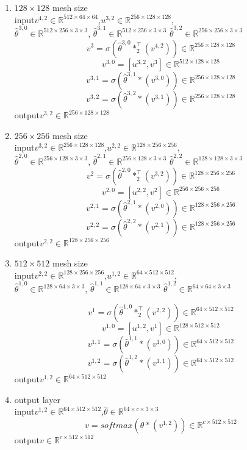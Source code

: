 \begin{enumerate}
	\item $128\times 128$ mesh size\\
	input\quad $v^{4,2} \in \mathbb{R}^{512\times 64\times 64}$,\quad$u^{3,2}\in \mathbb{R}^{256\times 128\times 128}$,\\
	$\hat{\theta}^{3,0} \in \mathbb{R}^{512\times 256\times 3\times 3}$,\quad
	$\hat{\theta}^{3,1} \in \mathbb{R}^{512\times 256\times 3\times 3}$\quad
	$\hat{\theta}^{3,2} \in \mathbb{R}^{256\times 256\times 3\times 3}$
	$$v^{3}= \sigma(\hat{\theta}^{3,0} \ast^{\top}_2 (v^{4,2}))\in \mathbb{R}^{256\times 128\times 128}$$
	$$v^{3,0}=[u^{3,2},v^{3}]\in \mathbb{R}^{512\times 128\times 128}$$
	$$v^{3,1}= \sigma(\hat{\theta}^{3,1} \ast (v^{3,0}))\in \mathbb{R}^{256\times 128\times 128}$$
	$$v^{3,2}= \sigma(\hat{\theta}^{3,2} \ast (v^{3,1}))\in \mathbb{R}^{256\times 128\times 128}$$
	output\quad $v^{3,2} \in \mathbb{R}^{256\times 128\times 128}$
	
	\item $256\times 256$ mesh size\\
	input\quad $v^{3,2} \in \mathbb{R}^{256\times 128\times 128}$,\quad$u^{2,2}\in \mathbb{R}^{128\times 256\times 256}$,\\
	$\hat{\theta}^{2,0} \in \mathbb{R}^{256\times 128\times 3\times 3}$,\quad
	$\hat{\theta}^{2,1} \in \mathbb{R}^{256\times 128\times 3\times 3}$\quad
	$\hat{\theta}^{2,2} \in \mathbb{R}^{128\times 128\times 3\times 3}$
	$$v^{2}= \sigma(\hat{\theta}^{2,0} \ast^{\top}_2 (v^{3,2}))\in \mathbb{R}^{128\times 256\times 256}$$
	$$v^{2,0}=[u^{2,2},v^{2}]\in \mathbb{R}^{256\times 256\times 256}$$
	$$v^{2,1}= \sigma(\hat{\theta}^{2,1} \ast (v^{2,0}))\in \mathbb{R}^{128\times 256\times 256}$$
	$$v^{2,2}= \sigma(\hat{\theta}^{2,2} \ast (v^{2,1}))\in \mathbb{R}^{128\times 256\times 256}$$
	output\quad $v^{2,2} \in \mathbb{R}^{128\times 256\times 256}$
	
	\item $512\times 512$ mesh size\\
	input\quad $v^{2,2} \in \mathbb{R}^{128\times 256\times 256}$,\quad$u^{1,2}\in \mathbb{R}^{64\times 512\times 512}$,\\
	$\hat{\theta}^{1,0} \in \mathbb{R}^{128\times 64\times 3\times 3}$,\quad
	$\hat{\theta}^{1,1} \in \mathbb{R}^{128\times 64\times 3\times 3}$\quad
	$\hat{\theta}^{1,2} \in \mathbb{R}^{64\times 64\times 3\times 3}$\quad
	
	$$v^{1}= \sigma(\hat{\theta}^{1,0} \ast^{\top}_2 (v^{2,2}))\in \mathbb{R}^{64\times 512\times 512}$$
	$$v^{1,0}=[u^{1,2},v^{1}]\in \mathbb{R}^{128\times 512\times 512}$$
	$$v^{1,1}= \sigma(\hat{\theta}^{1,1} \ast (v^{1,0}))\in \mathbb{R}^{64\times 512\times 512}$$
	$$v^{1,2}= \sigma(\hat{\theta}^{1,2} \ast (v^{1,1}))\in \mathbb{R}^{64\times 512\times 512}$$
	output\quad $v^{1,2} \in \mathbb{R}^{64\times 512\times 512}$     
	\item output layer\\
	input\quad $v^{1,2} \in \mathbb{R}^{64\times 512\times 512}$,\quad $\hat{\theta} \in \mathbb{R}^{64\times c \times 3\times 3}$
	$$v= softmax(\hat{\theta} \ast (v^{1,2}))\in \mathbb{R}^{c\times 512\times 512}$$
	output\quad $v \in \mathbb{R}^{c\times 512\times 512}$
\end{enumerate}

